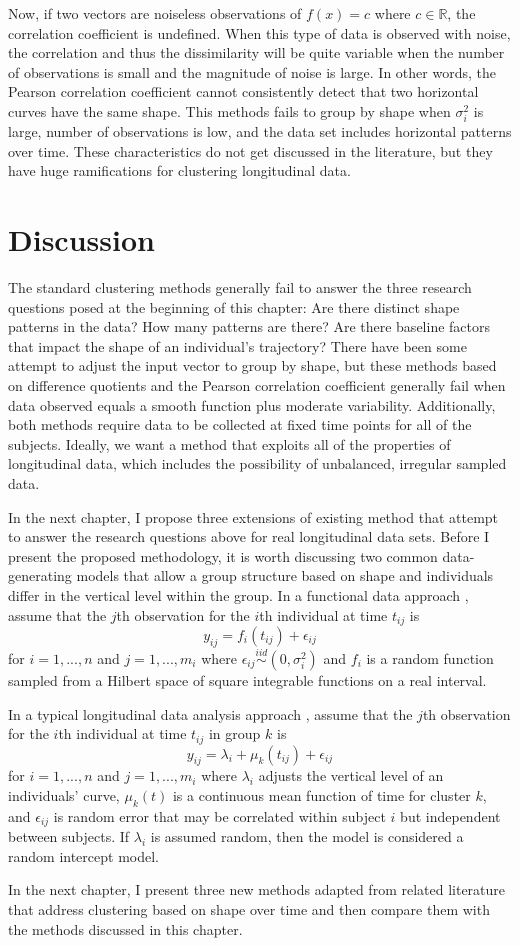Now, if two vectors are noiseless observations of $f(x)=c$ where $c\in\mathbb{R}$,  the correlation coefficient is undefined. When this type of data is observed with noise, the correlation and thus the dissimilarity will be quite variable when the number of observations is small and the magnitude of noise is large. In other words, the Pearson correlation coefficient cannot consistently detect that two horizontal curves have the same shape. This methods fails to group by shape when $\sigma_{i}^{2}$ is large, number of observations is low, and the data set includes horizontal patterns over time. These characteristics do not get discussed in the literature, but they have huge ramifications for clustering longitudinal data.

\section{Discussion}
The standard clustering methods generally fail to answer the three research questions posed at the beginning of this chapter: Are there distinct shape patterns in the data? How many patterns are there? Are there baseline factors that impact the shape of an individual's trajectory? There have been some attempt to adjust the input vector to group by shape, but these methods based on difference quotients and the Pearson correlation coefficient generally fail when data observed equals a smooth function plus moderate variability. Additionally, both methods require data to be collected at fixed time points for all of the subjects. Ideally, we want a method that exploits all of the properties of longitudinal data, which includes the possibility of unbalanced, irregular sampled data.

In the next chapter, I propose three extensions of existing method that attempt to answer the research questions above for real longitudinal data sets. Before I present the proposed methodology, it is worth discussing two common data-generating models that allow a group structure based on shape and individuals differ in the vertical level within the group. In a functional data approach \cite{ramsay2002}, assume that the $j$th observation for the $i$th individual at time $t_{ij}$ is
$$y_{ij}= f_i(t_{ij})+\epsilon_{ij}$$
for $i=1,...,n$ and $j=1,...,m_{i}$ where $\epsilon_{ij}\overset{iid}{\sim} (0,\sigma_{i}^{2})$ and $f_{i}$ is a random function sampled from a Hilbert space of square integrable functions on a real interval. 

In a typical longitudinal data analysis approach \cite{diggle2002}, assume that the $j$th observation for the $i$th individual at time $t_{ij}$ in group $k$ is
$$y_{ij}=\lambda_{i}+\mu_k(t_{ij})+\epsilon_{ij}$$
for $i=1,...,n$ and $j=1,...,m_{i}$ where $\lambda_{i}$ adjusts the vertical level of an individuals' curve, $\mu_k(t)$ is a continuous mean function of time for cluster $k$, and $\epsilon_{ij}$ is random error that may be correlated within subject $i$ but independent between subjects. If $\lambda_{i}$ is assumed random, then the model is considered a random intercept model. 

 In the next chapter, I present three new methods adapted from related literature that address clustering based on shape over time and then compare them with the methods discussed in this chapter.	
